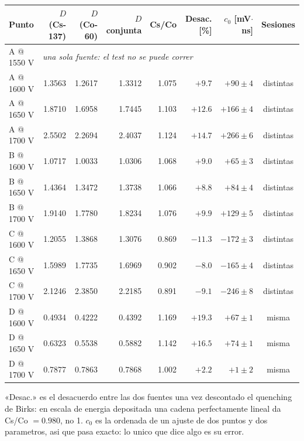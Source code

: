 \begin{tabular}{lrrrrrrc}
\toprule
\textbf{Punto} & \textbf{$D$(Cs-137)} & \textbf{$D$(Co-60)} & \textbf{$D$ conjunta} & \textbf{Cs/Co} & \textbf{Desac. [\%]} & \textbf{$c_0$ [mV$\cdot$ns]} & \textbf{Sesiones} \\
\midrule
A @ 1550 V & \multicolumn{7}{l}{\textit{una sola fuente: el test no se puede correr}} \\
A @ 1600 V & 1.3563 & 1.2617 & 1.3312 & 1.075 & $+9.7$ & $+90 \pm 4$ & distintas \\
A @ 1650 V & 1.8710 & 1.6958 & 1.7445 & 1.103 & $+12.6$ & $+166 \pm 4$ & distintas \\
A @ 1700 V & 2.5502 & 2.2694 & 2.4037 & 1.124 & $+14.7$ & $+266 \pm 6$ & distintas \\
B @ 1600 V & 1.0717 & 1.0033 & 1.0306 & 1.068 & $+9.0$ & $+65 \pm 3$ & distintas \\
B @ 1650 V & 1.4364 & 1.3472 & 1.3738 & 1.066 & $+8.8$ & $+84 \pm 4$ & distintas \\
B @ 1700 V & 1.9140 & 1.7780 & 1.8234 & 1.076 & $+9.9$ & $+129 \pm 5$ & distintas \\
C @ 1600 V & 1.2055 & 1.3868 & 1.3076 & 0.869 & $-11.3$ & $-172 \pm 3$ & distintas \\
C @ 1650 V & 1.5989 & 1.7735 & 1.6969 & 0.902 & $-8.0$ & $-165 \pm 4$ & distintas \\
C @ 1700 V & 2.1246 & 2.3850 & 2.2185 & 0.891 & $-9.1$ & $-246 \pm 8$ & distintas \\
D @ 1600 V & 0.4934 & 0.4222 & 0.4392 & 1.169 & $+19.3$ & $+67 \pm 1$ & misma \\
D @ 1650 V & 0.6323 & 0.5538 & 0.5882 & 1.142 & $+16.5$ & $+74 \pm 1$ & misma \\
D @ 1700 V & 0.7877 & 0.7863 & 0.7868 & 1.002 & $+2.2$ & $+1 \pm 2$ & misma \\
\bottomrule
\end{tabular}
\par\smallskip
\begin{minipage}{0.95\linewidth}\footnotesize «Desac.» es el desacuerdo entre las dos fuentes una vez descontado el quenching de Birks: en escala de energia depositada una cadena perfectamente lineal da Cs/Co $= 0.980$, no 1. $c_0$ es la ordenada de un ajuste de dos puntos y dos parametros, asi que pasa exacto: lo unico que dice algo es su error.\end{minipage}
